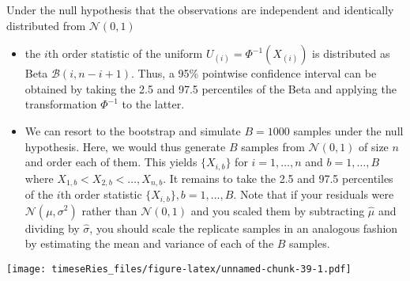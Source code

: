 \documentclass[]{book}
\newenvironment{Shaded}{\begin{snugshade}}{\end{snugshade}}
\newcommand{\KeywordTok}[1]{\textcolor[rgb]{0.13,0.29,0.53}{\textbf{#1}}}
\newcommand{\DataTypeTok}[1]{\textcolor[rgb]{0.13,0.29,0.53}{#1}}
\newcommand{\DecValTok}[1]{\textcolor[rgb]{0.00,0.00,0.81}{#1}}
\newcommand{\StringTok}[1]{\textcolor[rgb]{0.31,0.60,0.02}{#1}}
\newcommand{\OtherTok}[1]{\textcolor[rgb]{0.56,0.35,0.01}{#1}}
\newcommand{\OperatorTok}[1]{\textcolor[rgb]{0.81,0.36,0.00}{\textbf{#1}}}
\newcommand{\NormalTok}[1]{#1}
\providecommand{\tightlist}{%
  \setlength{\itemsep}{0pt}\setlength{\parskip}{0pt}}
\begin{document}
Under the null hypothesis that the observations are independent and
identically distributed from \(\mathcal{N}(0,1)\)

\begin{itemize}
\tightlist
\item
  the \(i\)th order statistic of the uniform
  \(U_{(i)}=\Phi^{-1}(X_{(i)})\) is distributed as Beta
  \(\mathcal{B}(i, n-i+1)\). Thus, a 95\% pointwise confidence interval
  can be obtained by taking the 2.5 and 97.5 percentiles of the Beta and
  applying the transformation \(\Phi^{-1}\) to the latter.
\item
  We can resort to the bootstrap and simulate \(B=1000\) samples under
  the null hypothesis. Here, we would thus generate \(B\) samples from
  \(\mathcal{N}(0,1)\) of size \(n\) and order each of them. This yields
  \(\{X_{i,b}\}\) for \(i=1, \ldots, n\) and \(b = 1, \ldots, B\) where
  \(X_{1,b} < X_{2, b} < \ldots, X_{n,b}\). It remains to take the 2.5
  and 97.5 percentiles of the \(i\)th order statistic
  \(\{X_{i, b}\}, b=1, \ldots, B\). Note that if your residuals were
  \(\mathcal{N}(\mu, \sigma^2)\) rather than \(\mathcal{N}(0,1)\) and
  you scaled them by subtracting \(\hat{\mu}\) and dividing by
  \(\hat{\sigma}\), you should scale the replicate samples in an
  analogous fashion by estimating the mean and variance of each of the
  \(B\) samples.
\end{itemize}

\begin{Shaded}
\end{Shaded}

\texttt{[image: timeseRies\_files/figure-latex/unnamed-chunk-39-1.pdf]}
\end{document}
